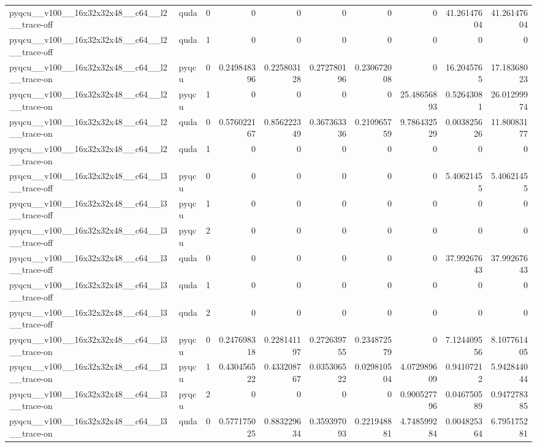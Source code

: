 \begin{table}[htbp]
\begin{tabular}{@{}llrrrrrrrr@{}}
pyqcu\_\_v100\_\_16x32x32x48\_\_c64\_\_l2\_\_trace-off & quda & 0 & 0 & 0 & 0 & 0 & 0 & 41.26147604 & 41.26147604 \\
pyqcu\_\_v100\_\_16x32x32x48\_\_c64\_\_l2\_\_trace-off & quda & 1 & 0 & 0 & 0 & 0 & 0 & 0 & 0 \\
pyqcu\_\_v100\_\_16x32x32x48\_\_c64\_\_l2\_\_trace-on & pyqcu & 0 & 0.249848396 & 0.225803128 & 0.272780196 & 0.230672008 & 0 & 16.2045765 & 17.18368023 \\
pyqcu\_\_v100\_\_16x32x32x48\_\_c64\_\_l2\_\_trace-on & pyqcu & 1 & 0 & 0 & 0 & 0 & 25.48656893 & 0.52643081 & 26.01299974 \\
pyqcu\_\_v100\_\_16x32x32x48\_\_c64\_\_l2\_\_trace-on & quda & 0 & 0.576022167 & 0.856222349 & 0.367363336 & 0.210965759 & 9.786432529 & 0.003825626 & 11.80083177 \\
pyqcu\_\_v100\_\_16x32x32x48\_\_c64\_\_l2\_\_trace-on & quda & 1 & 0 & 0 & 0 & 0 & 0 & 0 & 0 \\
pyqcu\_\_v100\_\_16x32x32x48\_\_c64\_\_l3\_\_trace-off & pyqcu & 0 & 0 & 0 & 0 & 0 & 0 & 5.40621455 & 5.40621455 \\
pyqcu\_\_v100\_\_16x32x32x48\_\_c64\_\_l3\_\_trace-off & pyqcu & 1 & 0 & 0 & 0 & 0 & 0 & 0 & 0 \\
pyqcu\_\_v100\_\_16x32x32x48\_\_c64\_\_l3\_\_trace-off & pyqcu & 2 & 0 & 0 & 0 & 0 & 0 & 0 & 0 \\
pyqcu\_\_v100\_\_16x32x32x48\_\_c64\_\_l3\_\_trace-off & quda & 0 & 0 & 0 & 0 & 0 & 0 & 37.99267643 & 37.99267643 \\
pyqcu\_\_v100\_\_16x32x32x48\_\_c64\_\_l3\_\_trace-off & quda & 1 & 0 & 0 & 0 & 0 & 0 & 0 & 0 \\
pyqcu\_\_v100\_\_16x32x32x48\_\_c64\_\_l3\_\_trace-off & quda & 2 & 0 & 0 & 0 & 0 & 0 & 0 & 0 \\
pyqcu\_\_v100\_\_16x32x32x48\_\_c64\_\_l3\_\_trace-on & pyqcu & 0 & 0.247698318 & 0.228141197 & 0.272639755 & 0.234872579 & 0 & 7.124409556 & 8.107761405 \\
pyqcu\_\_v100\_\_16x32x32x48\_\_c64\_\_l3\_\_trace-on & pyqcu & 1 & 0.430456522 & 0.433208767 & 0.035306522 & 0.029810504 & 4.072989609 & 0.94107212 & 5.942844044 \\
pyqcu\_\_v100\_\_16x32x32x48\_\_c64\_\_l3\_\_trace-on & pyqcu & 2 & 0 & 0 & 0 & 0 & 0.900527796 & 0.046750589 & 0.947278385 \\
pyqcu\_\_v100\_\_16x32x32x48\_\_c64\_\_l3\_\_trace-on & quda & 0 & 0.577175025 & 0.883229634 & 0.359397093 & 0.221948881 & 4.748599284 & 0.004825364 & 6.795175281 \\

\end{tabular}
\end{table}
